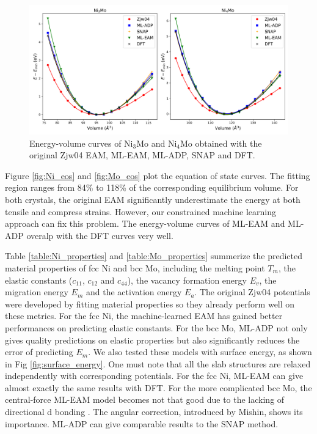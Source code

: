 \documentclass[final,3p,times]{elsarticle}
\begin{document}
% 
%
\begin{figure}
\centering
\includegraphics[scale=0.4]{alloy_eos.png}
\caption{\label{fig:alloy_eos} Energy-volume curves of Ni$_3$Mo and Ni$_4$Mo 
obtained with the original Zjw04 EAM, ML-EAM, ML-ADP, SNAP and DFT.}
\end{figure}

Figure \ref{fig:Ni_eos} and \ref{fig:Mo_eos} plot the equation of state 
curves. The fitting region ranges from 84\% to 118\% of the corresponding 
equilibrium volume. For both crystals, the original EAM significantly 
underestimate the energy at both tensile and compress strains. However, our 
constrained machine learning approach can fix this problem. The 
energy-volume curves of ML-EAM and ML-ADP overalp with the DFT curves very well. 

Table \ref{table:Ni_properties} and \ref{table:Mo_properties} summerize the 
predicted material properties of fcc Ni and bcc Mo, including the melting point 
$T_{m}$, the elastic constants ($c_{11}$, $c_{12}$ and $c_{44}$), the vacancy 
formation energy $E_{v}$, the migration energy $E_{m}$ and the activation energy 
$E_{a}$. The original Zjw04 potentials were developed by fitting material 
properties so they already perform well on these metrics. For the fcc Ni, the 
machine-learned EAM has gained better performances on predicting elastic 
constants. For the bcc Mo, ML-ADP not only gives quality predictions on elastic 
properties but also significantly reduces the error of predicting $E_m$. We also 
tested these models with surface energy, as shown in Fig 
\ref{fig:surface_energy}. One must note that all the slab structures are relaxed 
independently with corresponding potentials. For the fcc Ni, ML-EAM can give 
almost exactly the same results with DFT. For the more complicated bcc Mo, the 
central-force ML-EAM model becomes not that good due to the lacking of 
directional d bonding \cite{ADP0}. The angular correction, introduced by Mishin, 
shows its importance. ML-ADP can give comparable results to the SNAP method.
\end{document}
